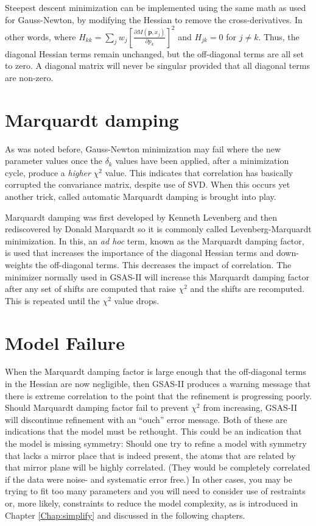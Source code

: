 Steepest descent minimization can be implemented using the same math as used for Gauss-Newton, by modifying the Hessian to remove the cross-derivatives. In other words, where $H_{kk} = \sum_j w_j  [\frac{\partial M(\textbf{p},x_j)}{\partial p_k}]^2$  and $H_{jk} = 0 $ for $j\neq k$. Thus, the diagonal Hessian terms remain unchanged, but the off-diagonal terms are all set to zero. A diagonal matrix will never be singular provided that all diagonal terms are non-zero. 

\section{Marquardt damping}\label{ref:Marquardt}
As was noted before, Gauss-Newton minimization may fail where the new parameter values once the $\delta_k$ values have been applied, after a minimization cycle, produce a \textit{higher} $\chi^2$ value. This indicates that correlation has basically corrupted the convariance matrix, despite use of SVD.  When this occurs yet another trick, called automatic Marquardt damping is brought into play. 

Marquardt damping was first developed by Kenneth Levenberg and then rediscovered by Donald Marquardt so it is commonly called Levenberg-Marquardt minimization. In this, an \textit{ad hoc} term, known as the Marquardt damping factor, is used that increases the importance of the diagonal Hessian terms and down-weights the off-diagonal terms. This decreases the impact of correlation. The minimizer normally used in GSAS-II will increase this Marquardt damping factor after any set of shifts are computed that raise $\chi^2$ and the shifts are recomputed. This is repeated until the $\chi^2$ value drops. 

\section{Model Failure}

When the Marquardt damping factor is large enough that the off-diagonal terms in the Hessian are now negligible, then GSAS-II produces a warning message that there is extreme correlation to the point that the refinement is progressing poorly. Should Marquardt damping factor fail to prevent $\chi^2$ from increasing, GSAS-II will discontinue refinement with an ``ouch'' error message. Both of these are indications that the model must be rethought. This could be an indication that the model is missing symmetry: Should one try to refine a model with symmetry that lacks a mirror place that is indeed present, the atoms that are related by that mirror plane will be highly correlated. (They would be completely correlated if the data were noise- and systematic error free.) In other cases, you may be trying to fit too many parameters and you will need to consider use of restraints or, more likely, constraints to reduce the model complexity, as is introduced in Chapter \ref{Chap:simplify} and discussed in the following chapters. 

